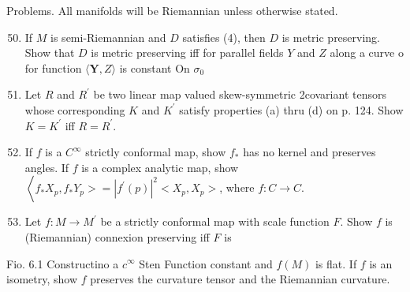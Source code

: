 \documentclass[10pt]{article}
\begin{document}
Problems. All manifolds will be Riemannian unless otherwise stated.

\begin{enumerate}
  \setcounter{enumi}{49}
  \item If $M$ is semi-Riemannian and $D$ satisfies (4), then $D$ is metric preserving. Show that $D$ is metric preserving iff for parallel fields $Y$ and $Z$ along a curve o for function $\langle\boldsymbol{Y}, Z\rangle$ is constant On $\sigma_{0}$

  \item Let $R$ and $R^{\prime}$ be two linear map valued skew-symmetric 2covariant tensors whose corresponding $K$ and $K^{\prime}$ satisfy properties (a) thru (d) on p. 124. Show $K=K^{\prime}$ iff $R=R^{\prime}$.

  \item If $f$ is a $C^{\infty}$ strictly conformal map, show $f_{*}$ has no kernel and preserves angles. If $f$ is a complex analytic map, show $\left\langle f_{*} X_{p}, f_{*} Y_{p}>=\left|f^{\prime}(p)\right|^{2}<X_{p}, X_{p}>\right.$, where $f: C \rightarrow C$.

  \item Let $f: M \rightarrow M^{\prime}$ be a strictly conformal map with scale function $F$. Show $f$ is (Riemannian) connexion preserving iff $F$ is

\end{enumerate}
Fio. 6.1 Constructino a $c^{\infty}$ Sten Function constant and $f(M)$ is flat. If $f$ is an isometry, show $f$ preserves the curvature tensor and the Riemannian curvature.
\end{document}
